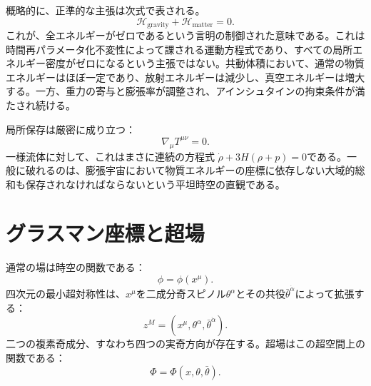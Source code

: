 概略的に、正準的な主張は次式で表される。
\begin{equation}
\mathcal H_{\mathrm{gravity}}
+\mathcal H_{\mathrm{matter}}
=0.
\end{equation}
これが、全エネルギーがゼロであるという言明の制御された意味である。これは時間再パラメータ化不変性によって課される運動方程式であり、すべての局所エネルギー密度がゼロになるという主張ではない。共動体積において、通常の物質エネルギーはほぼ一定であり、放射エネルギーは減少し、真空エネルギーは増大する。一方、重力の寄与と膨張率が調整され、アインシュタインの拘束条件が満たされ続ける。

局所保存は厳密に成り立つ：
\begin{equation}
\nabla_\mu T^{\mu\nu}=0.
\end{equation}
一様流体に対して、これはまさに連続の方程式
\(\dot\rho+3H(\rho+p)=0\)である。一般に破れるのは、膨張宇宙において物質エネルギーの座標に依存しない大域的総和も保存されなければならないという平坦時空の直観である。

\begin{classroomqa}
\end{classroomqa}

\section{グラスマン座標と超場}

\begin{classroomqa}
\end{classroomqa}

通常の場は時空の関数である：
\begin{equation}
\phi=\phi(x^\mu).
\end{equation}
四次元の最小超対称性は、\(x^\mu\)を二成分奇スピノル\(\theta^\alpha\)とその共役\(\bar\theta^{\dot\alpha}\)によって拡張する：
\begin{equation}
z^M=(x^\mu,\theta^\alpha,\bar\theta^{\dot\alpha}).
\end{equation}
二つの複素奇成分、すなわち四つの実奇方向が存在する。超場はこの超空間上の関数である：
\begin{equation}
\Phi=\Phi(x,\theta,\bar\theta).
\end{equation}

